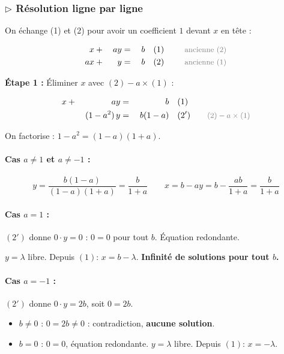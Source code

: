\documentclass[12pt,a4paper]{article}
\newcommand{\ann}[1]{\qquad\textcolor{opcolor}{\text{\small #1}}}
\begin{document}
\subsubsection*{$\triangleright$ Résolution ligne par ligne}

On échange (1) et (2) pour avoir un coefficient $1$ devant $x$ en tête :

\begin{alignat*}{3}
  x &{}+{}& ay         &{}={}& b       &\quad (1) \;\,\ann{ancienne (2)}\\
  ax &{}+{}& y          &{}={}& b       &\quad (2) \;\,\ann{ancienne (1)}
\end{alignat*}

\textbf{Étape 1 :} Éliminer $x$ avec $(2) - a\times(1)$ :

\begin{alignat*}{3}
  x &{}+{}& ay          &{}={}& b       &\quad (1)\\
    &     & (1-a^2)\,y  &{}={}& b(1-a)  &\quad (2') \ann{$(2)-a\times(1)$}
\end{alignat*}

On factorise : $1-a^2 = (1-a)(1+a)$.

\paragraph{Cas $a \neq 1$ et $a \neq -1$ :}
\[
y = \frac{b(1-a)}{(1-a)(1+a)} = \frac{b}{1+a}
\qquad
x = b - ay = b - \frac{ab}{1+a} = \frac{b}{1+a}
\]

\paragraph{Cas $a = 1$ :} $(2')$ donne $0\cdot y = 0$ : $0=0$ pour tout $b$. Équation redondante.

$y=\lambda$ libre. Depuis $(1)$: $x = b - \lambda$. \textbf{Infinité de solutions pour tout $b$.}

\paragraph{Cas $a = -1$ :} $(2')$ donne $0\cdot y = 2b$, soit $0 = 2b$.
\begin{itemize}[noitemsep]
  \item $b \neq 0$ : $0 = 2b \neq 0$ : contradiction, \textbf{aucune solution}.
  \item $b = 0$ : $0 = 0$, équation redondante. $y = \lambda$ libre. Depuis $(1)$: $x = -\lambda$.
\end{itemize}
\end{document}
